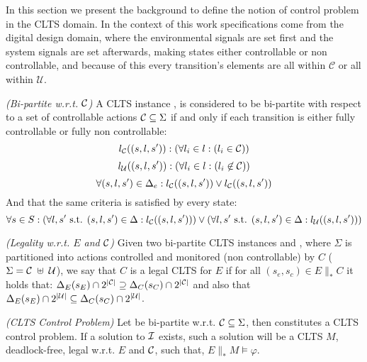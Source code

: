 In this section we present the background to define the notion of control problem in the CLTS domain.  In the context of this work specifications come from the digital design domain, where the environmental signals are set first and the system signals are set afterwards, making states either controllable or non controllable, and because of this every transition's elements are all within $\mathcal{C}$ or all within $\mathcal{U}$. 

\begin{definition}\label{def:bi-partite_clts} \emph{(Bi-partite w.r.t. ${\mathcal{C}}$)} 
A CLTS instance \cltsDef, is considered to be bi-partite with respect to a set of controllable actions ${\mathcal{C}} \subseteq \Sigma$ if and only if each transition is either fully controllable or fully non controllable:
\[ l_{{\mathcal{C}}}((s,l,s')): ( \forall l_i \in l:(l_i \in {\mathcal{C}}))\]
\[ l_{{\mathcal{U}}}((s,l,s')): ( \forall l_i \in l:(l_i \not\in {\mathcal{C}}))\]
\[ \forall (s,l,s') \in \Delta_e: l_{\mathcal{C}}((s,l,s')) \vee l_{{\mathcal{C}}}((s,l,s')) \]
And that the same criteria is satisfied by every state:
\[ \forall s \in S : (\forall l, s' \text{ s.t. } (s,l,s') \in \Delta:l_{{\mathcal{C}}}((s,l,s')))\vee (\forall l, s' \text{ s.t. } (s,l,s') \in \Delta:l_{{\mathcal{U}}}((s,l,s')))\]
\end{definition}

\begin{definition}
	\label{def:legal_clts} \emph{(Legality w.r.t. $E$ and ${\mathcal{C}}$)} 
	Given two bi-partite CLTS instances  and , where $\Sigma$ is partitioned into actions controlled and monitored (non controllable) by $C$ ($\Sigma={\mathcal{C}} \; \uplus \;{\mathcal{U}}$), we say that $C$ is a legal CLTS for $E$ if for all $(s_e,s_c) \in E \parallel_* C$ it holds that:
	$\Delta_{E}(s_E)\cap 2^{|{\mathcal{C}}|} \supseteq \Delta_{C}(s_C)\cap 2^{|{\mathcal{C}}|}$ and also that  $\Delta_{E}(s_E)\cap 2^{|{\mathcal{U}}|} \subseteq \Delta_{C}(s_C)\cap 2^{|{\mathcal{U}}|}$.
\end{definition}

\begin{definition}
	\label{def:clts_control_problem} \emph{(CLTS Control Problem)} 
	Let  be bi-partite w.r.t. ${\mathcal{C}} \subseteq \Sigma$, then \controlProblemDef constitutes a CLTS control problem. If a solution to ${\mathcal{I}}$ exists, such a solution will be a CLTS $M$, deadlock-free, legal w.r.t. $E$ and ${\mathcal{C}}$, such that, $E \parallel_* M \models \varphi$.
\end{definition}
